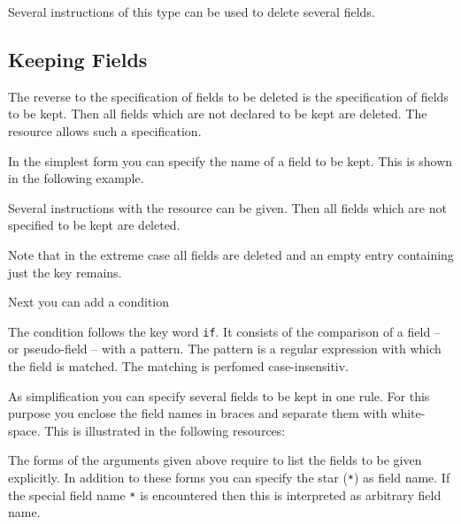 \documentclass[11pt,a4paper]{scrbook}
\begin{document}
Several instructions of this type can be used to delete several fields.


\subsection{Keeping Fields}

The reverse to the specification of fields to be deleted is the specification
of fields to be kept. Then all fields which are not declared to be kept are
deleted. The resource  allows such a specification.

In the simplest form you can specify the name of a field to be kept. This is
shown in the following example.

\begin{Resources}
\end{Resources}

Several instructions with the resource  can be given. Then all
fields which are not specified to be kept are deleted.

Note that in the extreme case all fields are deleted and an empty entry
containing just the key remains.

Next you can add a condition

\begin{Resources}
\end{Resources}

The condition follows the key word \texttt{if}. It consists of the comparison
of a field -- or pseudo-field -- with a pattern. The pattern is a regular
expression with which the field is matched. The matching is perfomed
case-insensitiv.

As simplification you can specify several fields to be kept in one rule. For
this purpose you enclose the field names in braces and separate them with
white-space. This is illustrated in the following resources:

\begin{Resources}
\end{Resources}

The forms of the arguments given above require to list the fields to be given
explicitly. In addition to these forms you can specify the star (\verb|*|) as
field name. If the special field name \verb|*| is encountered then this is
interpreted as arbitrary field name.
\end{document}
